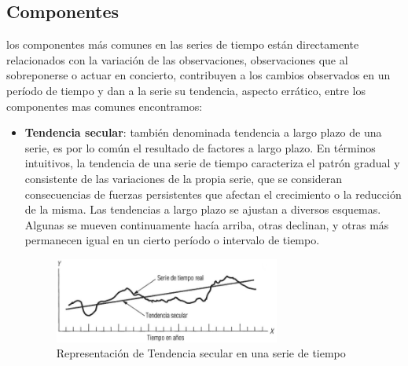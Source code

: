 \subsection{Componentes}

los componentes más comunes en las series de tiempo están directamente relacionados con la variación de las observaciones, observaciones que al 
sobreponerse o actuar en concierto, contribuyen a los cambios observados en un período de tiempo y dan a la serie su tendencia, aspecto errático, entre los
componentes mas comunes encontramos: 
\begin{itemize}
  \item{\textbf{Tendencia secular}}: también denominada tendencia a largo plazo de una serie, es por lo común el resultado de factores a largo plazo. 
  En términos intuitivos, la tendencia de una serie de tiempo caracteriza el patrón gradual y consistente de las variaciones de la propia serie, que 
  se consideran consecuencias de fuerzas persistentes que afectan el crecimiento o la reducción de la misma. Las tendencias a largo plazo se ajustan a 
  diversos esquemas. Algunas se mueven continuamente hacía arriba, otras declinan, y otras más permanecen igual en un cierto período o intervalo de tiempo.
  \begin{figure}[htb]
    \centering 
    \includegraphics[width=0.7\textwidth]{pictures/tsc1.png}
    \caption{Representación de Tendencia secular en una serie de tiempo}
    \label{fig:tsc1}
  \end{figure}
  

\end{itemize}
